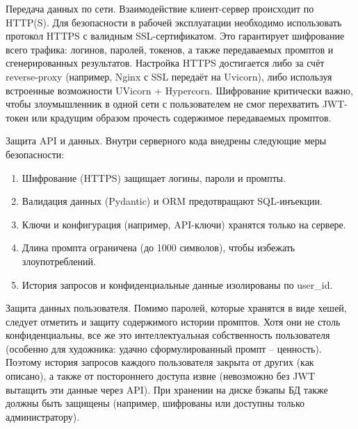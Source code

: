 Передача данных по сети. Взаимодействие клиент-сервер происходит по HTTP(S). Для безопасности в рабочей эксплуатации необходимо использовать протокол HTTPS с валидным SSL-сертификатом. Это гарантирует шифрование всего трафика: логинов, паролей, токенов, а также передаваемых промптов и сгенерированных результатов. Настройка HTTPS достигается либо за счёт reverse-proxy (например, Nginx с SSL передаёт на Uvicorn), либо используя встроенные возможности UVicorn + Hypercorn. Шифрование критически важно, чтобы злоумышленник в одной сети с пользователем не смог перехватить JWT-токен или крадущим образом прочесть содержимое передаваемых промптов.

Защита API и данных. Внутри серверного кода внедрены следующие меры безопасности:
\begin{enumerate}[label=\arabic*.]
    \item Шифрование (HTTPS) защищает логины, пароли и промпты.
    \item Валидация данных (Pydantic) и ORM предотвращают SQL-инъекции.
    \item Ключи и конфигурация (например, API-ключи) хранятся только на сервере.
    \item Длина промпта ограничена (до 1000 символов), чтобы избежать злоупотреблений.
    \item История запросов и конфиденциальные данные изолированы по user\_id.
\end{enumerate}

Защита данных пользователя. Помимо паролей, которые хранятся в виде хешей, следует отметить и защиту содержимого истории промптов. Хотя они не столь конфиденциальны, все же это интеллектуальная собственность пользователя (особенно для художника: удачно сформулированный промпт – ценность). Поэтому история запросов каждого пользователя закрыта от других (как описано), а также от постороннего доступа извне (невозможно без JWT вытащить эти данные через API). При хранении на диске бэкапы БД также должны быть защищены (например, шифрованы или доступны только администратору).

